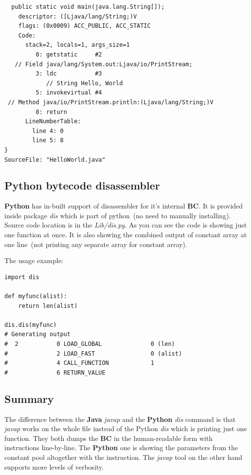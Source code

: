 \documentclass[thesis=M,english]{FITthesis}[2018/10/20]
\begin{document}
\begin{lstlisting}
  public static void main(java.lang.String[]);
    descriptor: ([Ljava/lang/String;)V
    flags: (0x0009) ACC_PUBLIC, ACC_STATIC
    Code:
      stack=2, locals=1, args_size=1
         0: getstatic     #2
   // Field java/lang/System.out:Ljava/io/PrintStream;
         3: ldc           #3
         	// String Hello, World
         5: invokevirtual #4
 // Method java/io/PrintStream.println:(Ljava/lang/String;)V
         8: return
      LineNumberTable:
        line 4: 0
        line 5: 8
}
SourceFile: "HelloWorld.java"

\end{lstlisting}

\subsection{Python bytecode disassembler}

\textbf{Python} has in-built support of disassembler for it's internal \textbf{BC}. It is provided inside package \textit{dis} which is part of python~(no need to manually installing). Source code location is in the \textit{Lib/dis.py}. As you can see the code is showing just one function at once. It is also showing the combined output of constant array at one line~(not printing any separate array for constant array).

The usage example:
\begin{lstlisting}
import dis

def myfunc(alist):
    return len(alist)

dis.dis(myfunc)
# Generating output
#  2           0 LOAD_GLOBAL              0 (len)
#              2 LOAD_FAST                0 (alist)
#              4 CALL_FUNCTION            1
#              6 RETURN_VALUE

\end{lstlisting}

\subsection{Summary}

The difference between the \textbf{Java} \textit{javap} and the \textbf{Python} \textit{dis} command is that \textit{javap} works on the whole file instead of the Python \textit{dis} which is printing just one function. They both dumps the \textbf{BC} in the human-readable form with instructions line-by-line. The \textbf{Python} one is showing the parameters from the constant pool altogether with the instruction. The \textit{javap} tool on the other hand supports more levels of verbosity.
\end{document}
